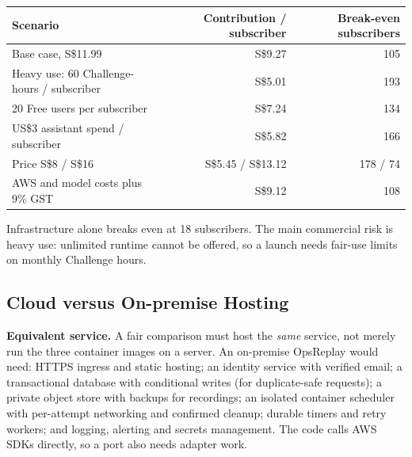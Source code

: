 \documentclass[11pt,a4paper]{article}
\begin{document}
\begin{center}\small
\begin{tabular}{@{}lrr@{}}
\toprule
Scenario & Contribution / subscriber & Break-even subscribers\\
\midrule
Base case, S\$11.99 & S\$9.27 & 105\\
Heavy use: 60 Challenge-hours / subscriber & S\$5.01 & 193\\
20 Free users per subscriber & S\$7.24 & 134\\
US\$3 assistant spend / subscriber & S\$5.82 & 166\\
Price S\$8 / S\$16 & S\$5.45 / S\$13.12 & 178 / 74\\
AWS and model costs plus 9\% GST & S\$9.12 & 108\\
\bottomrule
\end{tabular}
\end{center}
Infrastructure alone breaks even at 18 subscribers. The main commercial risk
is heavy use: unlimited runtime cannot be offered, so a launch needs fair-use
limits on monthly Challenge hours.

\subsection{Cloud versus On-premise Hosting}
\label{sec:onprem}
\textbf{Equivalent service.} A fair comparison must host the \emph{same}
service, not merely run the three container images on a server. An on-premise
OpsReplay would need: HTTPS ingress and static hosting; an identity service with
verified email; a transactional database with conditional writes (for
duplicate-safe requests); a private object store with backups for recordings;
an isolated container scheduler with per-attempt networking and confirmed
cleanup; durable timers and retry workers; and logging, alerting and secrets
management. The code calls AWS SDKs directly, so a port also needs adapter work.
\end{document}
